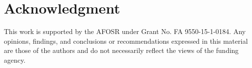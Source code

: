 \documentclass[10pt, conference, compsocconf]{IEEEtran}
\begin{document}
\section*{Acknowledgment}
\noindent
This work is supported by the AFOSR under Grant No. FA 9550-15-1-0184. Any opinions, findings, and conclusions or recommendations expressed in this material are those of the authors and do not necessarily reflect the views of the funding agency. %






\end{document}
